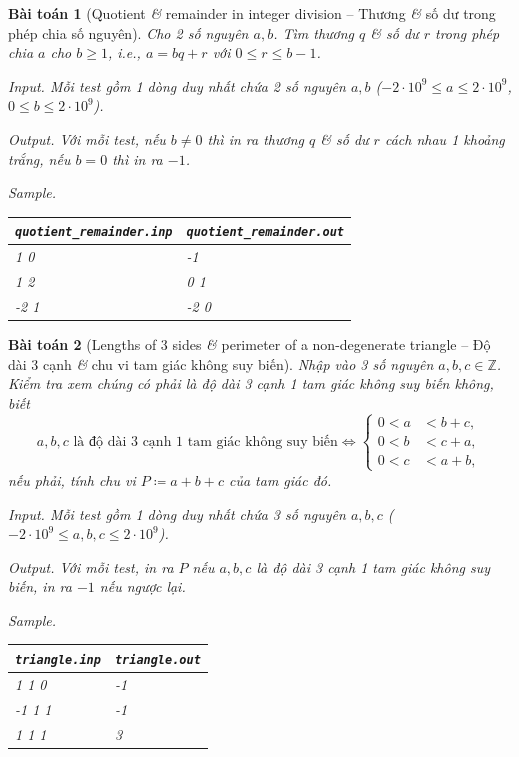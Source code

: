 \documentclass{article}
\newtheorem{baitoan}{Bài toán}
\begin{document}
\begin{baitoan}[Quotient {\it\&} remainder in integer division -- Thương {\it\&} số dư trong phép chia số nguyên]
	Cho 2 số nguyên $a,b$. Tìm thương $q$ {\it\&} số dư $r$ trong phép chia $a$ cho $b\ge1$, i.e., $a = bq + r$ với $0\le r\le b - 1$.
	\item {\sf Input.} Mỗi test gồm 1 dòng duy nhất chứa 2 số nguyên $a,b$ ($-2\cdot10^9\le a\le2\cdot10^9$, $0\le b\le2\cdot10^9$).
	\item {\sf Output.} Với mỗi test, nếu $b\ne0$ thì in ra thương $q$ {\it\&} số dư $r$ cách nhau 1 khoảng trắng, nếu $b = 0$ thì in ra $-1$.
	\item {\sf Sample.}
	\begin{table}[H]
		\centering
		\begin{tabular}{|l|l|}
			\hline
			\verb|quotient_remainder.inp| & \verb|quotient_remainder.out| \\
			\hline
			1 0 & -1\\
			\hline
			1 2 & 0 1 \\
			\hline
			-2 1 & -2 0\\
			\hline
		\end{tabular}
	\end{table}
\end{baitoan}

\begin{baitoan}[Lengths of 3 sides {\it\&} perimeter of a non-degenerate triangle -- Độ dài 3 cạnh {\it\&} chu vi tam giác không suy biến]
    Nhập vào 3 số nguyên $a,b,c\in\mathbb{Z}$. Kiểm tra xem chúng có phải là độ dài 3 cạnh 1 tam giác không suy biến không, biết
    \begin{equation*}
    	a,b,c\mbox{ là độ dài 3 cạnh 1 tam giác không suy biến}\Leftrightarrow\left\{\begin{split}
    		0 < a &< b + c,\\
    		0 < b &< c + a,\\
    		0 < c &< a + b,
    	\end{split}\right.
    \end{equation*}
    nếu phải, tính chu vi $P\coloneqq a + b + c$ của tam giác đó.
    \item {\sf Input.} Mỗi test gồm 1 dòng duy nhất chứa 3 số nguyên $a,b,c$ ($-2\cdot10^9\le a,b,c\le2\cdot10^9$).
    \item {\sf Output.} Với mỗi test, in ra $P$ nếu $a,b,c$ là độ dài 3 cạnh 1 tam giác không suy biến, in ra $-1$ nếu ngược lại.
    \item {\sf Sample.}
    \begin{table}[H]
        \centering
        \begin{tabular}{|l|l|}
            \hline
            \verb|triangle.inp| & \verb|triangle.out| \\
            \hline
            1 1 0 & -1\\
            \hline
            -1 1 1 & -1\\
            \hline
            1 1 1 & 3\\
            \hline
        \end{tabular}
    \end{table}
\end{baitoan}
\end{document}

